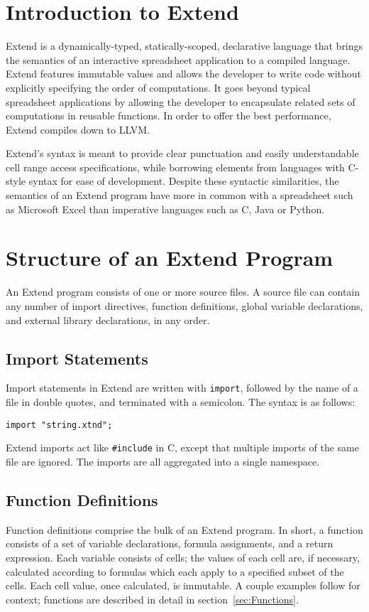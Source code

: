 \section{Introduction to Extend}
	Extend is a dynamically-typed, statically-scoped, declarative language that brings the semantics of an interactive spreadsheet application to a compiled language. Extend features immutable values and allows the developer to write code without explicitly specifying the order of computations. It goes beyond typical spreadsheet applications by allowing the developer to encapsulate related sets of computations in reusable functions. In order to offer the best performance, Extend compiles down to LLVM.

	Extend's syntax is meant to provide clear punctuation and easily understandable cell range access specifications, while borrowing elements from languages with C-style syntax for ease of development. Despite these syntactic similarities, the semantics of an Extend program have more in common with a spreadsheet such as Microsoft Excel than imperative languages such as C, Java or Python.

\section{Structure of an Extend Program}
\label{sec:Grammar}
	An Extend program consists of one or more source files. A source file can contain any number of import directives, function definitions, global variable declarations, and external library declarations, in any order.
	\subsection{Import Statements}
		Import statements in Extend are written with \texttt{import}, followed by the name of a file in double quotes, and terminated with a semicolon. The syntax is as follows:
		\begin{lstlisting}
import "string.xtnd";
		\end{lstlisting}
		Extend imports act like \texttt{\#include} in C, except that multiple imports of the same file are ignored. The imports are all aggregated into a single namespace.
		\subsection{Function Definitions}
			Function definitions comprise the bulk of an Extend program. In short, a function consists of a set of variable declarations, formula assignments, and a return expression. Each variable consists of cells; the values of each cell are, if necessary, calculated according to formulas which each apply to a specified subset of the cells. Each cell value, once calculated, is immutable. A couple examples follow for context; functions are described in detail in section~\ref{sec:Functions}.
			
